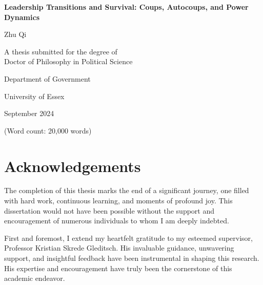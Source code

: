 \documentclass[
  12pt,
]{report}
\author{}
\date{}
\renewcommand*\contentsname{Table of contents}
\newcommand\contentsname{Table of contents}
\begin{document}
\begin{titlepage}
  \begin{center}
    \vspace*{2cm}
    
    \Huge{\textbf{Leadership Transitions and Survival: Coups, Autocoups, and Power Dynamics}}
    
    \vspace{1.5cm}
    
    \Large{Zhu Qi}
    
    \vspace{5cm}
    
    \large{A thesis submitted for the degree of \\ Doctor of Philosophy in Political Science}
    
    \vspace{0.8cm}
    
    \large{Department of Government}
    \vspace{0.5cm}
    
    \large{University of Essex}
    
    \vspace{1.5cm}
    
    \large{September 2024}
    \vspace{2cm}
    
    \large{(Word count: 20,000 words)}
    
  \end{center}
\end{titlepage}

\renewcommand*\contentsname{Contents}
{
\hypersetup{linkcolor=}
\setcounter{tocdepth}{2}
\tableofcontents
}
\listoffigures
\listoftables

\chapter*{Acknowledgements}\label{acknowledgements}

The completion of this thesis marks the end of a significant journey,
one filled with hard work, continuous learning, and moments of profound
joy. This dissertation would not have been possible without the support
and encouragement of numerous individuals to whom I am deeply indebted.

First and foremost, I extend my heartfelt gratitude to my esteemed
supervisor, Professor Kristian Skrede Gleditsch. His invaluable
guidance, unwavering support, and insightful feedback have been
instrumental in shaping this research. His expertise and encouragement
have truly been the cornerstone of this academic endeavor.
\end{document}
